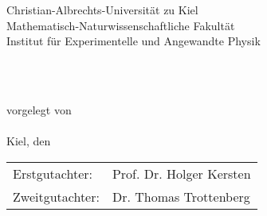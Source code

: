 \begin{titlepage}
\cleardoublepage{}
   
\begin{minipage}[t]{.6\linewidth} %
     \vspace*{0pt} {\Large Christian-Albrechts-Universität zu Kiel\\}
                Mathematisch-Naturwissenschaftliche Fakultät\\
                Institut für Experimentelle und Angewandte Physik\\
\end{minipage}%


\vspace*{4.2cm}

	{\Huge\begin{center}
		{\textbf{\@title}}
	\end{center}}

	\vspace{2.cm}
	
	\begin{center}
		{\large{\textbf{\@subject}}\\}
		\vspace{0.5cm}
	\end{center}

	\vspace{1cm}

	\begin{center}
		\textbf{}\\
		vorgelegt von\\
		\@author\\
		\vspace{0.6cm}
		{Kiel, den \@date}
	\end{center}

	\vspace*{\fill}
	\pagestyle{empty}
	
	\begin{flushleft}
	    \begin{tabular}{l l}
            Erstgutachter: & Prof. Dr. Holger Kersten\\
		    Zweitgutachter: & Dr. Thomas Trottenberg\\
        \end{tabular}
	\end{flushleft}
	

\end{titlepage}